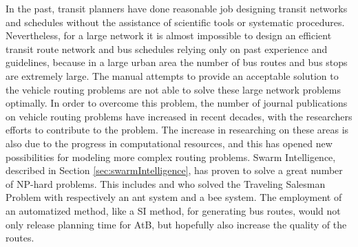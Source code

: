 
In the past, transit planners have done reasonable job designing transit networks and schedules without the assistance of scientific tools or systematic procedures. Nevertheless, for a large network it is almost impossible to design an efficient transit route network and bus schedules relying only on past experience and guidelines, because in a large urban area the number of bus routes and bus stops are extremely large. The manual attempts to provide an acceptable solution to the vehicle routing problems are not able to solve these large network problems optimally. In order to overcome this problem, the number of journal publications on vehicle routing problems have increased in recent decades, with the researchers efforts to contribute to the problem.  The increase in researching on these areas is also due to the progress in computational resources, and this has opened new possibilities for modeling more complex routing problems. Swarm Intelligence, described in Section \vref{sec:swarmIntelligence}, has proven to solve a great number of NP-hard problems. This includes \citet{dorigo97} and \citet{lucic03} who solved the Traveling Salesman Problem with respectively an ant system and a bee system. The employment of an automatized method, like a SI method, for generating bus routes, would not only release planning time for AtB, but hopefully also increase the quality of the routes. 
